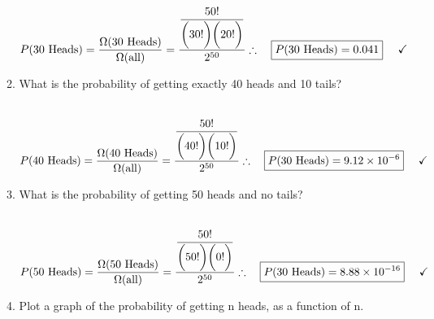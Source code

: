 \documentclass[fleqn]{article}
\begin{document}
\begin{enumerate}
\begin{enumerate}
        \textcolor{hwColor}{
          \\
          $
            P(30 ~ \text{Heads})=\dfrac{\Omega(30 ~ \text{Heads})}{\Omega(\text{all})}
            =\dfrac{
              \dfrac{50!}{\bigg( 30! \bigg) \bigg( 20! \bigg)}
            }{
              2^{50}
            }
            \\
            \\
            \therefore ~~~ \boxed{
              P(30 ~ \text{Heads})=0.041
            } ~~~~ \checkmark
            \\
            \\
          $
        }

      \item What is the probability of getting exactly 40 heads and 10 tails?

        \textcolor{hwColor}{
          \\
          $
            P(40 ~ \text{Heads})=\dfrac{\Omega(40 ~ \text{Heads})}{\Omega(\text{all})}
            =\dfrac{
              \dfrac{50!}{\bigg( 40! \bigg) \bigg( 10! \bigg)}
            }{
              2^{50}
            }
            \\
            \\
            \therefore ~~~ \boxed{
              P(30 ~ \text{Heads})=9.12 \times 10^{-6}
            } ~~~~ \checkmark
            \\
            \\
          $
        }

      \item What is the probability of getting 50 heads and no tails?

        \textcolor{hwColor}{
          \\
            $
            P(50 ~ \text{Heads})=\dfrac{\Omega(50 ~ \text{Heads})}{\Omega(\text{all})}
            =\dfrac{
              \dfrac{50!}{\bigg( 50! \bigg) \bigg( 0! \bigg)}
            }{
              2^{50}
            }
            \\
            \\
            \therefore ~~~ \boxed{
              P(30 ~ \text{Heads})=8.88 \times 10^{-16}
            } ~~~~ \checkmark
            \\
            \\
          $
        }

      \item Plot a graph of the probability of getting n heads, as a function of n.


\end{enumerate}
\end{enumerate}
\end{document}
